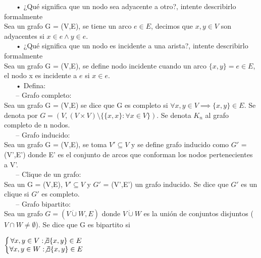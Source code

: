 \documentclass[a4paper,12pt]{article}
\begin{document}
$ ~~~~~~ $ • ¿Qué significa que un nodo sea adyacente a otro?, intente describirlo formalmente \\

Sea un grafo G = (V,E), se tiene un arco $e \in E$, decimos que $x,y \in V$ son adyacentes si $x \in e \land y \in e$. \\

$ ~~~~~~ $ • ¿Qué significa que un nodo es incidente a una arista?, intente describirlo formalmente \\

Sea un grafo G = (V,E), se define nodo incidente cuando un arco $\{x,y\} = e \in E$, el nodo x es incidente a $e$ si $x \in e$. \\

$ ~~~~~~ $ • Defina: \\

$ ~~~~~~ $ – Grafo completo: \\

Sea un grafo G = (V,E) se dice que G es completo si $\forall x,y \in V \implies \{x,y\} \in E$. Se denota por $G = (V, (V \times V) \setminus \{\{x, x \}: \forall x \in V\})$. Se denota $K_n$ al grafo completo de n nodos. \\

$ ~~~~~~ $ – Grafo inducido: \\

Sea un grafo G = (V,E), se toma $V' \subseteq V$ y se define grafo inducido como $G'$ = (V',E') donde E' es el conjunto de arcos que conforman los nodos pertenecientes a V'. \\

$ ~~~~~~ $ – Clique de un grafo: \\

Sea un G = (V,E), $V' \subseteq V$ y $G'$ = (V',E') un grafo inducido. Se dice que $G'$ es un clique si $G'$ es completo. \\

$ ~~~~~~ $ – Grafo bipartito: \\

Sea un grafo $G = (V \dot{\cup} W, E)$ donde $V \dot{\cup} W$ es la unión de conjuntos disjuntos ($V \cap W \neq \emptyset$). Se dice que G es bipartito si \par 

\begin{center}
$\left\{\begin{matrix}
\forall x, y \in V: \not \exists \{x,y\} \in E \\
\forall x, y \in W: \not \exists \{x,y\} \in E
\end{matrix}\right. $ \\
\end{center}
\end{document}
